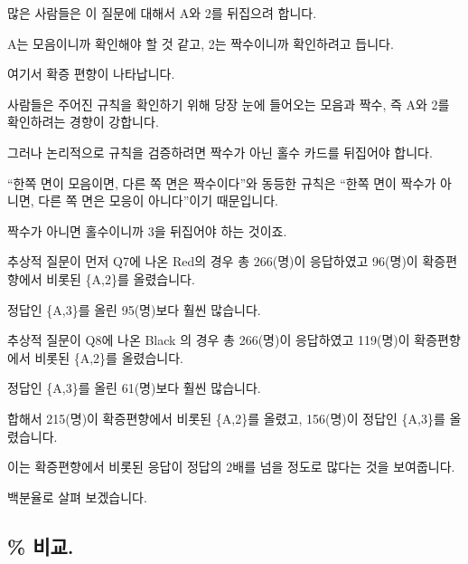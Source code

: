 \documentclass[
]{book}
\begin{document}
많은 사람들은 이 질문에 대해서 A와 2를 뒤집으려 합니다.

A는 모음이니까 확인해야 할 것 같고, 2는 짝수이니까 확인하려고 듭니다.

여기서 확증 편향이 나타납니다.

사람들은 주어진 규칙을 확인하기 위해 당장 눈에 들어오는 모음과 짝수, 즉 A와 2를 확인하려는 경향이 강합니다.

그러나 논리적으로 규칙을 검증하려면 짝수가 아닌 홀수 카드를 뒤집어야 합니다.

``한쪽 면이 모음이면, 다른 쪽 면은 짝수이다''와 동등한 규칙은 ``한쪽 면이 짝수가 아니면, 다른 쪽 면은 모응이 아니다''이기 때문입니다.

짝수가 아니면 홀수이니까 3을 뒤집어야 하는 것이죠.

추상적 질문이 먼저 Q7에 나온 Red의 경우 총 266(명)이 응답하였고 96(명)이 확증편향에서 비롯된 \{A,2\}를 올렸습니다.

정답인 \{A,3\}를 올린 95(명)보다 훨씬 많습니다.

추상적 질문이 Q8에 나온 Black 의 경우 총 266(명)이 응답하였고 119(명)이 확증편향에서 비롯된 \{A,2\}를 올렸습니다.

정답인 \{A,3\}를 올린 61(명)보다 훨씬 많습니다.

합해서 215(명)이 확증편향에서 비롯된 \{A,2\}를 올렸고, 156(명)이 정답인 \{A,3\}를 올렸습니다.

이는 확증편향에서 비롯된 응답이 정답의 2배를 넘을 정도로 많다는 것을 보여줍니다.

백분율로 살펴 보겠습니다.

\subsection{\% 비교.}\label{uxbe44uxad50.-4}
\end{document}
